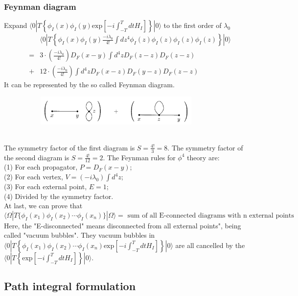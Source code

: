 \documentclass{article}
\begin{document}
\subsubsection{Feynman diagram}
Expand $\langle 0 | T \left\{ \phi_I(x) \phi_I(y) \mathrm{exp} \left[ -i \int_{-T}^{T} dt H_I \right]\right\} | 0 \rangle$ to the first order of $\lambda_0$
\begin{eqnarray}
& &\langle 0 | T \left\{ \phi_I(x) \phi_I(y) \frac{-i\lambda_0}{4!} \int dz^4 \phi_I(z) \phi_I(z) \phi_I(z) \phi_I(z) \right\} | 0 \rangle \nonumber \\
&=& 3 \cdot (\frac{-i\lambda_0}{4!}) D_F(x-y) \int d^4 z D_F(z-z) D_F(z-z) \nonumber \\
&+& 12 \cdot (\frac{-i\lambda_0}{4!}) \int d^4 z  D_F(x-z) D_F(y-z) D_F(z-z) \nonumber
\end{eqnarray}
It can be represented by the so called Feynman diagram.
\begin{figure}[!h]
\centering
\includegraphics[height=1.5cm ,width=10cm]{./pic/FD1.png}
\caption*{}
\end{figure}
\\
The symmetry factor of the first diagram is $S = \frac{4!}{3} = 8$.
The symmetry factor of the second diagram is $S = \frac{4!}{12} = 2$.
The Feynman rules for $\phi^4$ theory are:\\
(1) For each propagator, $P = D_F(x-y)$;\\
(2) For each vertex, $V = (-i\lambda_0)\int d^4z$;\\
(3) For each external point, $E=1$;\\
(4) Divided by the symmetry factor.\\
At last, we can prove that
\[\langle \Omega | T \{ \phi_I(x_1) \phi_I(x_2) \cdots \phi_I(x_n) \} | \Omega \rangle = \mbox{ sum of all E-connected diagrams with n external points}\]
Here, the "E-disconnected" means disconnected from all external points", being called "vacuum bubbles". They vacuum bubbles in $\langle 0 | T \left\{ \phi_I(x_1) \phi_I(x_2) \cdots \phi_I(x_n) \mathrm{exp} \left[ -i \int_{-T}^{T} dt H_I \right]\right\} | 0 \rangle$ are all cancelled by the $\langle 0 | T \left\{ \mathrm{exp} \left[ -i \int_{-T}^{T} dt H_I \right]\right\} | 0 \rangle$.

\subsection{Path integral formulation}
\end{document}

